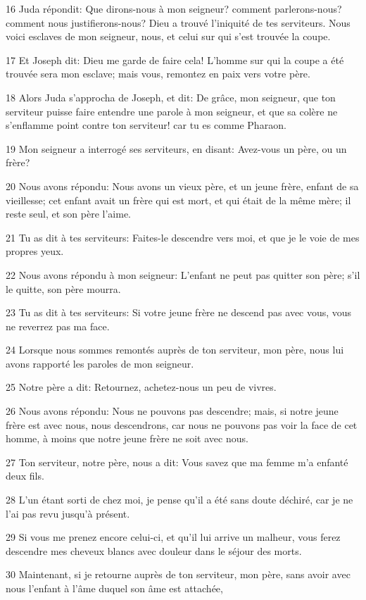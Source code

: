 \par 16 Juda répondit: Que dirons-nous à mon seigneur? comment parlerons-nous? comment nous justifierons-nous? Dieu a trouvé l'iniquité de tes serviteurs. Nous voici esclaves de mon seigneur, nous, et celui sur qui s'est trouvée la coupe.
\par 17 Et Joseph dit: Dieu me garde de faire cela! L'homme sur qui la coupe a été trouvée sera mon esclave; mais vous, remontez en paix vers votre père.
\par 18 Alors Juda s'approcha de Joseph, et dit: De grâce, mon seigneur, que ton serviteur puisse faire entendre une parole à mon seigneur, et que sa colère ne s'enflamme point contre ton serviteur! car tu es comme Pharaon.
\par 19 Mon seigneur a interrogé ses serviteurs, en disant: Avez-vous un père, ou un frère?
\par 20 Nous avons répondu: Nous avons un vieux père, et un jeune frère, enfant de sa vieillesse; cet enfant avait un frère qui est mort, et qui était de la même mère; il reste seul, et son père l'aime.
\par 21 Tu as dit à tes serviteurs: Faites-le descendre vers moi, et que je le voie de mes propres yeux.
\par 22 Nous avons répondu à mon seigneur: L'enfant ne peut pas quitter son père; s'il le quitte, son père mourra.
\par 23 Tu as dit à tes serviteurs: Si votre jeune frère ne descend pas avec vous, vous ne reverrez pas ma face.
\par 24 Lorsque nous sommes remontés auprès de ton serviteur, mon père, nous lui avons rapporté les paroles de mon seigneur.
\par 25 Notre père a dit: Retournez, achetez-nous un peu de vivres.
\par 26 Nous avons répondu: Nous ne pouvons pas descendre; mais, si notre jeune frère est avec nous, nous descendrons, car nous ne pouvons pas voir la face de cet homme, à moins que notre jeune frère ne soit avec nous.
\par 27 Ton serviteur, notre père, nous a dit: Vous savez que ma femme m'a enfanté deux fils.
\par 28 L'un étant sorti de chez moi, je pense qu'il a été sans doute déchiré, car je ne l'ai pas revu jusqu'à présent.
\par 29 Si vous me prenez encore celui-ci, et qu'il lui arrive un malheur, vous ferez descendre mes cheveux blancs avec douleur dans le séjour des morts.
\par 30 Maintenant, si je retourne auprès de ton serviteur, mon père, sans avoir avec nous l'enfant à l'âme duquel son âme est attachée,

